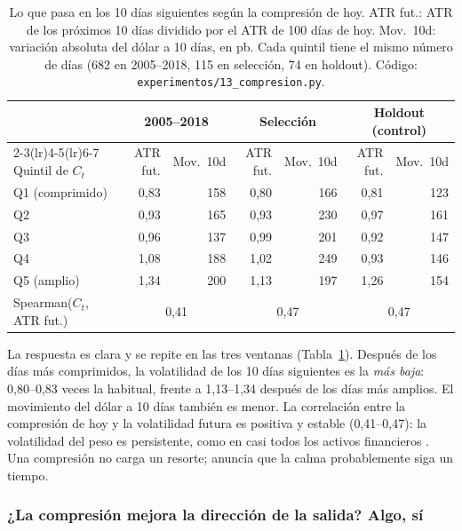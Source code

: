 \documentclass[10pt,a4paper]{article}
\newcommand{\ruta}[1]{\nolinkurl{#1}}
\begin{document}
\begin{table}[htb]\centering\small
\begin{tabular}{@{}lrrrrrr@{}}
\toprule
& \multicolumn{2}{c}{2005--2018} & \multicolumn{2}{c}{Selección} & \multicolumn{2}{c}{Holdout (control)} \\
\cmidrule(lr){2-3}\cmidrule(lr){4-5}\cmidrule(lr){6-7}
Quintil de $C_t$ & ATR fut. & Mov.\ 10d & ATR fut. & Mov.\ 10d & ATR fut. & Mov.\ 10d \\
\midrule
Q1 (comprimido) & 0{,}83 & 158 & 0{,}80 & 166 & 0{,}81 & 123 \\
Q2              & 0{,}93 & 165 & 0{,}93 & 230 & 0{,}97 & 161 \\
Q3              & 0{,}96 & 137 & 0{,}99 & 201 & 0{,}92 & 147 \\
Q4              & 1{,}08 & 188 & 1{,}02 & 249 & 0{,}93 & 146 \\
Q5 (amplio)     & 1{,}34 & 200 & 1{,}13 & 197 & 1{,}26 & 154 \\
\midrule
Spearman($C_t$, ATR fut.) & \multicolumn{2}{c}{0{,}41} & \multicolumn{2}{c}{0{,}47} & \multicolumn{2}{c}{0{,}47} \\
\bottomrule
\end{tabular}
\caption{Lo que pasa en los 10 días siguientes según la compresión de hoy. ATR fut.:
ATR de los próximos 10 días dividido por el ATR de 100 días de hoy. Mov.\ 10d: variación
absoluta del dólar a 10 días, en pb. Cada quintil tiene el mismo número de días (682 en
2005--2018, 115 en selección, 74 en holdout). Código:
\ruta{experimentos/13_compresion.py}.}\label{tab:comp_mag}
\end{table}

La respuesta es clara y se repite en las tres ventanas (Tabla~\ref{tab:comp_mag}).
Después de los días más comprimidos, la volatilidad de los 10 días siguientes es la
\emph{más baja}: 0,80--0,83 veces la habitual, frente a 1,13--1,34 después de los días
más amplios. El movimiento del dólar a 10 días también es menor. La correlación entre la
compresión de hoy y la volatilidad futura es positiva y estable (0,41--0,47): la
volatilidad del peso es persistente, como en casi todos los activos financieros
\citep{bollerslev1986}. Una compresión no carga un resorte; anuncia que la calma
probablemente siga un tiempo.

\subsubsection{¿La compresión mejora la dirección de la salida? Algo, sí}
\end{document}
